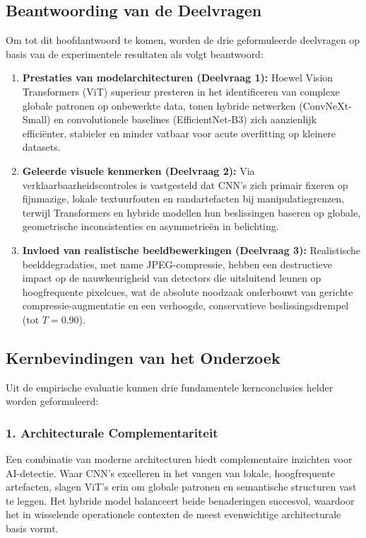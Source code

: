 \subsection{Beantwoording van de Deelvragen}
Om tot dit hoofdantwoord te komen, worden de drie geformuleerde deelvragen op basis van de experimentele resultaten als volgt beantwoord:
\begin{enumerate}
    \item \textbf{Prestaties van modelarchitecturen (Deelvraag 1):} Hoewel Vision Transformers (ViT) superieur presteren in het identificeren van complexe globale patronen op onbewerkte data, tonen hybride netwerken (ConvNeXt-Small) en convolutionele baselines (EfficientNet-B3) zich aanzienlijk efficiënter, stabieler en minder vatbaar voor acute overfitting op kleinere datasets.
    \item \textbf{Geleerde visuele kenmerken (Deelvraag 2):} Via verklaarbaarheidscontroles is vastgesteld dat CNN's zich primair fixeren op fijnmazige, lokale textuurfouten en randartefacten bij manipulatiegrenzen, terwijl Transformers en hybride modellen hun beslissingen baseren op globale, geometrische inconsistenties en asymmetrieën in belichting.
    \item \textbf{Invloed van realistische beeldbewerkingen (Deelvraag 3):} Realistische beelddegradaties, met name JPEG-compressie, hebben een destructieve impact op de nauwkeurigheid van detectors die uitsluitend leunen op hoogfrequente pixelcues, wat de absolute noodzaak onderbouwt van gerichte compressie-augmentatie en een verhoogde, conservatieve beslissingsdrempel (tot $T=0.90$).
\end{enumerate}

\subsection{Kernbevindingen van het Onderzoek}
Uit de empirische evaluatie kunnen drie fundamentele kernconclusies helder worden geformuleerd:

\subsubsection{1. Architecturale Complementariteit}
Een combinatie van moderne architecturen biedt complementaire inzichten voor AI-detectie. Waar CNN's excelleren in het vangen van lokale, hoogfrequente artefacten, slagen ViT's erin om globale patronen en semantische structuren vast te leggen. Het hybride model balanceert beide benaderingen succesvol, waardoor het in wisselende operationele contexten de meest evenwichtige architecturale basis vormt.

